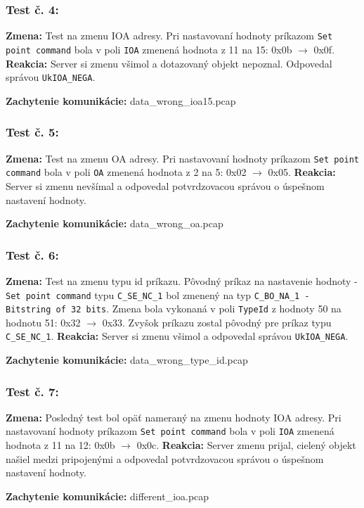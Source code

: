 \subsubsection{Test č. 4:}
\textbf{Zmena:} Test na zmenu IOA adresy. Pri nastavovaní hodnoty príkazom {\tt Set point command} bola v poli {\tt IOA} zmenená hodnota z 11 na 15: 0x0b $\rightarrow$ 0x0f. \newline
\textbf{Reakcia:} Server si zmenu všimol a dotazovaný objekt nepoznal. Odpovedal správou {\tt UkIOA\_NEGA}. \par
\noindent \textbf{Zachytenie komunikácie:} data\_wrong\_ioa15.pcap
\subsubsection{Test č. 5:}
\textbf{Zmena:} Test na zmenu OA adresy. Pri nastavovaní hodnoty príkazom {\tt Set point command} bola v poli {\tt OA} zmenená hodnota z 2 na 5: 0x02 $\rightarrow$ 0x05. \newline
\textbf{Reakcia:} Server si zmenu nevšímal a odpovedal potvrdzovacou správou o úspešnom nastavení hodnoty. \par
\noindent \textbf{Zachytenie komunikácie:} data\_wrong\_oa.pcap
\subsubsection{Test č. 6:}
\textbf{Zmena:} Test na zmenu typu id príkazu. Pôvodný príkaz na nastavenie hodnoty - {\tt Set point command} typu {\tt C\_SE\_NC\_1} bol zmenený na typ {\tt C\_BO\_NA\_1 - Bitstring of 32 bits}. Zmena bola vykonaná v poli {\tt TypeId} z hodnoty 50 na hodnotu 51: 0x32 $\rightarrow$ 0x33. Zvyšok príkazu zostal pôvodný pre príkaz typu {\tt C\_SE\_NC\_1}. \newline
\textbf{Reakcia:} Server si zmenu všimol a odpovedal správou {\tt UkIOA\_NEGA}. \par
\noindent \textbf{Zachytenie komunikácie:} data\_wrong\_type\_id.pcap
\subsubsection{Test č. 7:}
\textbf{Zmena:} Posledný test bol opäť nameraný na zmenu hodnoty IOA adresy. Pri nastavovaní hodnoty príkazom {\tt Set point command} bola v poli {\tt IOA} zmenená hodnota z 11 na 12: 0x0b $\rightarrow$ 0x0c. \newline
\textbf{Reakcia:} Server zmenu prijal, cielený objekt našiel medzi pripojenými a odpovedal potvrdzovacou správou o úspešnom nastavení hodnoty. \par
\noindent \textbf{Zachytenie komunikácie:} different\_ioa.pcap \newline









